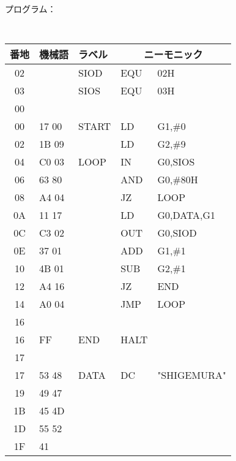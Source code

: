 \begin{center}
{{\begin{description}
\item[プログラム：]
\end{description}
\begin{center}
{\footnotesize\tt
\begin{tabular}{|c|l|l|l l|} \hline
番地 & 機械語 & ラベル & \multicolumn{2}{|c|}{ニーモニック} \\
\hline
02 &        & SIOD   & EQU    & 02H            \\
03 &        & SIOS   & EQU    & 03H            \\
00 &        &        &        &                \\
00 & 17 00  & START  & LD     & G1,\#0         \\
02 & 1B 09  &        & LD     & G2,\#9         \\
04 & C0 03  & LOOP   & IN     & G0,SIOS        \\
06 & 63 80  &        & AND    & G0,\#80H       \\
08 & A4 04  &        & JZ     & LOOP           \\
0A & 11 17  &        & LD     & G0,DATA,G1     \\
0C & C3 02  &        & OUT    & G0,SIOD        \\
0E & 37 01  &        & ADD    & G1,\#1         \\
10 & 4B 01  &        & SUB    & G2,\#1         \\
12 & A4 16  &        & JZ     & END            \\
14 & A0 04  &        & JMP    & LOOP           \\
16 &        &        &        &                \\
16 & FF     & END    & HALT   &                \\
17 &        &        &        &                \\
17 & 53 48  & DATA   & DC     & "SHIGEMURA"    \\
19 & 49 47  &        &        &                \\
1B & 45 4D  &        &        &                \\
1D & 55 52  &        &        &                \\
1F & 41     &        &        &                \\
\hline
\end{tabular}
}
\end{center}
}}
\end{center}

